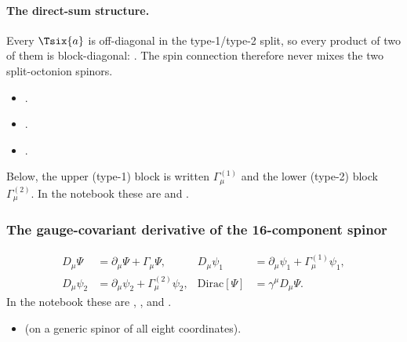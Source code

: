 \paragraph{The direct-sum structure.} Every $\Tsix{a}$ is off-diagonal in the type-1/type-2 split,
so every product of two of them is block-diagonal:
. The spin
connection therefore never mixes the two split-octonion spinors.
\begin{itemize}
  \item {} .
  \item {} .
  \item {} .
\end{itemize}
Below, the upper (type-1) block is written $\Gamma^{(1)}_\mu$ and the lower (type-2) block
$\Gamma^{(2)}_\mu$. In the notebook these are  and .

\subsubsection{The gauge-covariant derivative of the 16-component spinor}
\label{csc:dirac}\label{sec:3.8.8}

\begin{equation}
\begin{aligned}
  D_\mu\Psi&=\partial_\mu\Psi+\Gamma_\mu\Psi, &
  D_\mu\psi_1&=\partial_\mu\psi_1+\Gamma^{(1)}_\mu\psi_1,\\
  D_\mu\psi_2&=\partial_\mu\psi_2+\Gamma^{(2)}_\mu\psi_2, &
  \mathrm{Dirac}[\Psi]&=\gamma^\mu D_\mu\Psi .
\end{aligned}
\end{equation}
In the notebook these are ,
,  and
.
\begin{itemize}
  \item {} 
    (on a generic spinor of all eight coordinates).
\end{itemize}

